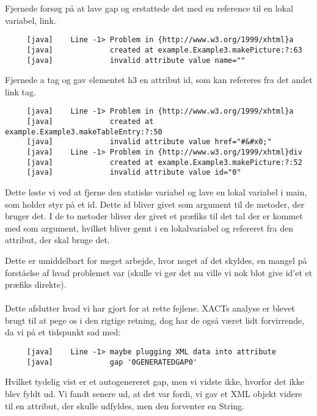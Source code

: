 \documentclass[a4paper,10pt]{article}
\begin{document}
Fjernede forsøg på at lave gap og erstattede det med en reference til en lokal variabel, link.
\begin{lstlisting}
     [java]    Line -1> Problem in {http://www.w3.org/1999/xhtml}a 
     [java]             created at example.Example3.makePicture:?:63
     [java]             invalid attribute value name=""
\end{lstlisting}
Fjernede a tag og gav elementet h3 en attribut id, som kan refereres fra det andet link tag.
\begin{lstlisting}
     [java]    Line -1> Problem in {http://www.w3.org/1999/xhtml}a 
     [java]             created at example.Example3.makeTableEntry:?:50
     [java]             invalid attribute value href="#&#x0;"
     [java]    Line -1> Problem in {http://www.w3.org/1999/xhtml}div 
     [java]             created at example.Example3.makePicture:?:52
     [java]             invalid attribute value id="0"
\end{lstlisting}
Dette løste vi ved at fjerne den statiske variabel og lave en lokal variabel i main, som holder styr på et id. Dette id bliver givet som argument til de metoder, der bruger det. I de to metoder bliver der givet et præfiks til det tal der er kommet med som argument, hvilket bliver gemt i en lokalvariabel og refereret fra den attribut, der skal bruge det.

Dette er umiddelbart for meget arbejde, hvor noget af det skyldes, en mangel på forståelse af hvad problemet var (skulle vi gør det nu ville vi nok blot give id'et et præfiks direkte).\\\\
Dette afslutter hvad vi har gjort for at rette fejlene. XACTs analyse er blevet brugt til at pege os i den rigtige retning, dog har de også været lidt forvirrende, da vi på et tidspunkt sad med:
\begin{lstlisting}
     [java]    Line -1> maybe plugging XML data into attribute
     [java]             gap '0GENERATEDGAP0'
\end{lstlisting} 
Hvilket tydelig vist er et autogenereret gap, men vi vidste ikke, hvorfor det ikke blev fyldt ud. Vi fandt senere ud, at det var fordi, vi gav et XML objekt videre til en attribut, der skulle udfyldes, men den forventer en String.
{}
 

 
\end{document}
